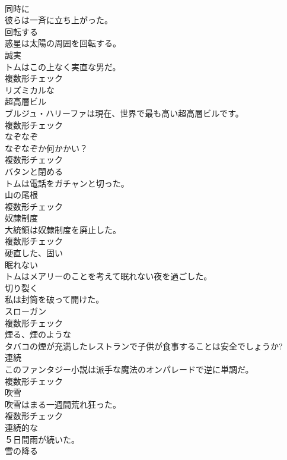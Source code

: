 \documentclass[8pt]{extreport}
\begin{document}
\begin{CJK}{UTF8}{min}
\\	[副詞]	同時に	
\\	彼らは一斉に立ち上がった。	
\\	[動詞]	回転する	
\\	惑星は太陽の周囲を回転する。	
\\	[名詞]	誠実	
\\	トムはこの上なく実直な男だ。	
\\	複数形チェック
\\	[形容詞]	リズミカルな	
\\	[名詞]	超高層ビル	
\\	ブルジュ・ハリーファは現在、世界で最も高い超高層ビルです。	
\\	複数形チェック
\\	[名詞]	なぞなぞ	
\\	なぞなぞか何かかい？	
\\	複数形チェック
\\	[動詞]	バタンと閉める	
\\	トムは電話をガチャンと切った。	
\\	[名詞]	山の尾根	
\\	複数形チェック
\\	[名詞]	奴隷制度	
\\	大統領は奴隷制度を廃止した。	
\\	複数形チェック
\\	[形容詞]	硬直した、固い	
\\	[形容詞]	眠れない	
\\	トムはメアリーのことを考えて眠れない夜を過ごした。	
\\	[動詞]	切り裂く	
\\	私は封筒を破って開けた。	
\\	[名詞]	スローガン	
\\	複数形チェック
\\	[形容詞]	煙る、煙のような	
\\	タバコの煙が充満したレストランで子供が食事することは安全でしょうか?	
\\	[名詞]	連続	
\\	このファンタジー小説は派手な魔法のオンパレードで逆に単調だ。	
\\	複数形チェック
\\	[名詞]	吹雪	
\\	吹雪はまる一週間荒れ狂った。	
\\	複数形チェック
\\	[形容詞]	連続的な	
\\	５日間雨が続いた。	
\\	[形容詞]	雪の降る	

\end{CJK}
\end{document}
